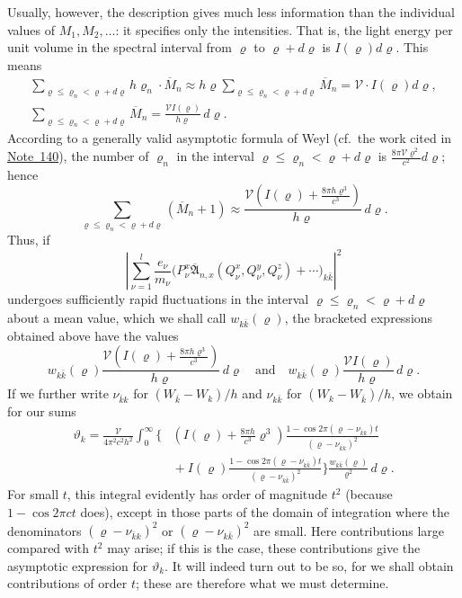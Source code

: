 \documentclass[fontsize=13pt,twoside,openany,headings=normal,parskip=false,bookmarkpackage=false,DIV=calc]{scrbook}
\begin{document}
Usually, however, the description gives much less information than the individual values of $M_1,M_2,\ldots$: it specifies only the intensities. That is, the light energy per unit volume in the spectral interval from $\varrho$ to
\hypertarget{origpage-154}{}$\varrho+d\varrho$ is $I(\varrho)d\varrho$. This means
\begin{gather*}
 \sum_{\varrho\le\varrho_n<\varrho+d\varrho}h\varrho_n\cdot\overline M_n
 \approx h\varrho\sum_{\varrho\le\varrho_n<\varrho+d\varrho}\overline M_n
 =\mathcal V\cdot I(\varrho)d\varrho,\\
 \sum_{\varrho\le\varrho_n<\varrho+d\varrho}\overline M_n
 =\frac{\mathcal V I(\varrho)}{h\varrho}\,d\varrho.
\end{gather*}
According to a generally valid asymptotic formula of Weyl (cf.\ the work cited in \hyperlink{note-140}{Note~140}), the number of $\varrho_n$ in the interval $\varrho\le\varrho_n<\varrho+d\varrho$ is $\frac{8\pi\mathcal V\varrho^2}{c^2}d\varrho$; hence
\[
 \sum_{\varrho\le\varrho_n<\varrho+d\varrho}(\overline M_n+1)
 \approx\frac{\mathcal V\left(I(\varrho)+\frac{8\pi h\varrho^3}{c^3}\right)}{h\varrho}\,d\varrho.
\]
Thus, if
\[
 \left|\sum_{\nu=1}^{l}\frac{e_\nu}{m_\nu}
 \bigl(P_\nu^x\overline{\mathfrak A}_{n,x}(Q_\nu^x,Q_\nu^y,Q_\nu^z)+\cdots\bigr)_{k\bar k}\right|^2
\]
undergoes sufficiently rapid fluctuations in the interval $\varrho\le\varrho_n<\varrho+d\varrho$ about a mean value, which we shall call $w_{k\bar k}(\varrho)$, the bracketed expressions obtained above have the values
\[
 w_{k\bar k}(\varrho)\frac{\mathcal V\left(I(\varrho)+\frac{8\pi h\varrho^3}{c^3}\right)}{h\varrho}\,d\varrho
 \quad\text{and}\quad
 w_{k\bar k}(\varrho)\frac{\mathcal V I(\varrho)}{h\varrho}\,d\varrho.
\]
If we further write $\nu_{\bar k k}$ for $(W_{\bar k}-W_k)/h$ and $\nu_{k\bar k}$ for $(W_k-W_{\bar k})/h$, we obtain for our sums
\begin{align*}
 \vartheta_k=\frac{\mathcal V}{4\pi^2c^2h^2}\int_0^{\infty}
 \biggl\{&\left(I(\varrho)+\frac{8\pi h}{c^3}\varrho^3\right)
 \frac{1-\cos2\pi(\varrho-\nu_{\bar k k})t}{(\varrho-\nu_{\bar k k})^2}\\
 &{}+I(\varrho)\frac{1-\cos2\pi(\varrho-\nu_{k\bar k})t}{(\varrho-\nu_{k\bar k})^2}
 \biggr\}\frac{w_{k\bar k}(\varrho)}{\varrho^2}\,d\varrho.
\end{align*}
For small $t$, this integral evidently has order of magnitude $t^2$ (because $1-\cos2\pi ct$ does), except in those parts of the domain of integration where the denominators $(\varrho-\nu_{\bar k k})^2$ or $(\varrho-\nu_{k\bar k})^2$ are small. Here contributions large compared with $t^2$ may arise; if this is the case, these contributions give the asymptotic expression for $\vartheta_k$. It will indeed turn out to be so, for we shall obtain contributions of order $t$; these are therefore what we must determine.
\end{document}

